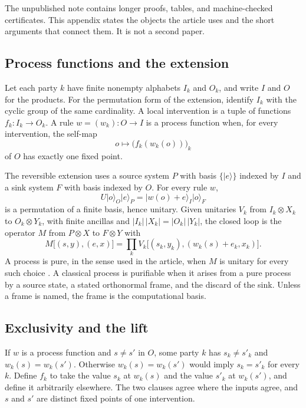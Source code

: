 \documentclass[11pt]{article}
\begin{document}
The unpublished note contains longer proofs, tables, and machine-checked certificates. This appendix states the objects the article uses and the short arguments that connect them. It is not a second paper.

\subsection{Process functions and the extension}
\label{app:def}

Let each party \(k\) have finite nonempty alphabets \(I_k\) and \(O_k\), and write \(I\) and \(O\) for the products. For the permutation form of the extension, identify \(I_k\) with the cyclic group of the same cardinality. A local intervention is a tuple of functions \(f_k\colon I_k\to O_k\). A rule \(w = (w_k)\colon O\to I\) is a process function when, for every intervention, the self-map
\[
o \longmapsto \bigl(f_k(w_k(o))\bigr)_k
\]
of \(O\) has exactly one fixed point.

The reversible extension uses a source system \(P\) with basis \(\{\lvert e\rangle\}\) indexed by \(I\) and a sink system \(F\) with basis indexed by \(O\). For every rule \(w\),
\[
U\lvert o\rangle_O\lvert e\rangle_P = \lvert w(o)+e\rangle_I\lvert o\rangle_F
\]
is a permutation of a finite basis, hence unitary. Given unitaries \(V_k\) from \(I_k\otimes X_k\) to \(O_k\otimes Y_k\), with finite ancillas and \(|I_k|\,|X_k| = |O_k|\,|Y_k|\), the closed loop is the operator \(M\) from \(P\otimes X\) to \(F\otimes Y\) with
\[
M\bigl[(s,y),(e,x)\bigr]
= \prod_k V_k\bigl[(s_k,y_k),(w_k(s)+e_k,x_k)\bigr].
\]
A process is pure, in the sense used in the article, when \(M\) is unitary for every such choice \citep{araujo2017}. A classical process is purifiable when it arises from a pure process by a source state, a stated orthonormal frame, and the discard of the sink. Unless a frame is named, the frame is the computational basis.

\subsection{Exclusivity and the lift}
\label{app:lift}

If \(w\) is a process function and \(s\neq s'\) in \(O\), some party \(k\) has \(s_k\neq s'_k\) and \(w_k(s)=w_k(s')\). Otherwise \(w_k(s)=w_k(s')\) would imply \(s_k=s'_k\) for every \(k\). Define \(f_k\) to take the value \(s_k\) at \(w_k(s)\) and the value \(s'_k\) at \(w_k(s')\), and define it arbitrarily elsewhere. The two clauses agree where the inputs agree, and \(s\) and \(s'\) are distinct fixed points of one intervention.
\end{document}
